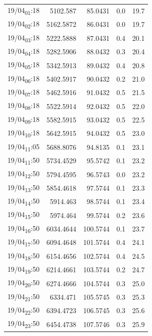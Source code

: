 \documentclass[11pt]{article}
\begin{document}
\begin{center}
\begin{tabular}{lrrrr}
19/04\textsubscript{01}:18 & 5102.587 & 85.0431 & 0.0 & 19.7\\[0pt]
19/04\textsubscript{02}:18 & 5162.5872 & 86.0431 & 0.0 & 19.7\\[0pt]
19/04\textsubscript{03}:18 & 5222.5888 & 87.0431 & 0.4 & 20.1\\[0pt]
19/04\textsubscript{04}:18 & 5282.5906 & 88.0432 & 0.3 & 20.4\\[0pt]
19/04\textsubscript{05}:18 & 5342.5913 & 89.0432 & 0.4 & 20.8\\[0pt]
19/04\textsubscript{06}:18 & 5402.5917 & 90.0432 & 0.2 & 21.0\\[0pt]
19/04\textsubscript{07}:18 & 5462.5916 & 91.0432 & 0.5 & 21.5\\[0pt]
19/04\textsubscript{08}:18 & 5522.5914 & 92.0432 & 0.5 & 22.0\\[0pt]
19/04\textsubscript{09}:18 & 5582.5915 & 93.0432 & 0.5 & 22.5\\[0pt]
19/04\textsubscript{10}:18 & 5642.5915 & 94.0432 & 0.5 & 23.0\\[0pt]
19/04\textsubscript{11}:05 & 5688.8076 & 94.8135 & 0.1 & 23.1\\[0pt]
19/04\textsubscript{11}:50 & 5734.4529 & 95.5742 & 0.1 & 23.2\\[0pt]
19/04\textsubscript{12}:50 & 5794.4595 & 96.5743 & 0.0 & 23.2\\[0pt]
19/04\textsubscript{13}:50 & 5854.4618 & 97.5744 & 0.1 & 23.3\\[0pt]
19/04\textsubscript{14}:50 & 5914.463 & 98.5744 & 0.1 & 23.4\\[0pt]
19/04\textsubscript{15}:50 & 5974.464 & 99.5744 & 0.2 & 23.6\\[0pt]
19/04\textsubscript{16}:50 & 6034.4644 & 100.5744 & 0.1 & 23.7\\[0pt]
19/04\textsubscript{17}:50 & 6094.4648 & 101.5744 & 0.4 & 24.1\\[0pt]
19/04\textsubscript{18}:50 & 6154.4656 & 102.5744 & 0.4 & 24.5\\[0pt]
19/04\textsubscript{19}:50 & 6214.4661 & 103.5744 & 0.2 & 24.7\\[0pt]
19/04\textsubscript{20}:50 & 6274.4666 & 104.5744 & 0.3 & 25.0\\[0pt]
19/04\textsubscript{21}:50 & 6334.471 & 105.5745 & 0.3 & 25.3\\[0pt]
19/04\textsubscript{22}:50 & 6394.4723 & 106.5745 & 0.3 & 25.6\\[0pt]
19/04\textsubscript{23}:50 & 6454.4738 & 107.5746 & 0.3 & 25.9\\[0pt]

\end{tabular}
\end{center}
\end{document}
